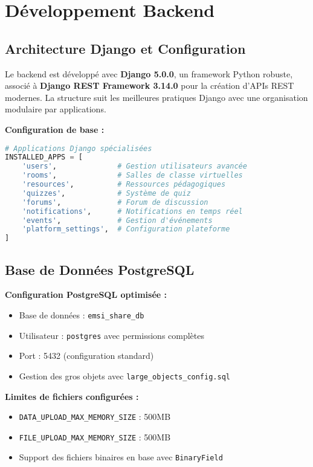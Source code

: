 \documentclass[12pt,a4paper]{article}
\begin{document}
\section{Développement Backend}

\subsection{Architecture Django et Configuration}

Le backend est développé avec \textbf{Django 5.0.0}, un framework Python robuste, associé à \textbf{Django REST Framework 3.14.0} pour la création d'APIs REST modernes. La structure suit les meilleures pratiques Django avec une organisation modulaire par applications.

\textbf{Configuration de base :}
\begin{lstlisting}[language=Python]
# Applications Django spécialisées
INSTALLED_APPS = [
    'users',              # Gestion utilisateurs avancée
    'rooms',              # Salles de classe virtuelles
    'resources',          # Ressources pédagogiques
    'quizzes',            # Système de quiz
    'forums',             # Forum de discussion
    'notifications',      # Notifications en temps réel
    'events',             # Gestion d'événements
    'platform_settings',  # Configuration plateforme
]
\end{lstlisting}

\subsection{Base de Données PostgreSQL}

\textbf{Configuration PostgreSQL optimisée :}
\begin{itemize}
    \item Base de données : \texttt{emsi\_share\_db}
    \item Utilisateur : \texttt{postgres} avec permissions complètes
    \item Port : 5432 (configuration standard)
    \item Gestion des gros objets avec \texttt{large\_objects\_config.sql}
\end{itemize}

\textbf{Limites de fichiers configurées :}
\begin{itemize}
    \item \texttt{DATA\_UPLOAD\_MAX\_MEMORY\_SIZE} : 500MB
    \item \texttt{FILE\_UPLOAD\_MAX\_MEMORY\_SIZE} : 500MB
    \item Support des fichiers binaires en base avec \texttt{BinaryField}
\end{itemize}
\end{document}

